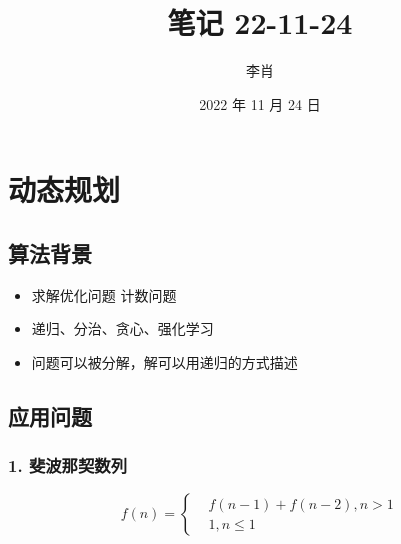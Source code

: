 \documentclass[UTF8]{ctexart}
\title{笔记 22-11-24}
\author{李肖}
\date{2022 年 11 月 24 日}
\begin{document}
\maketitle

\section*{动态规划}

\subsection*{算法背景}

\begin{itemize}
    \item 求解优化问题 计数问题
    \item 递归、分治、贪心、强化学习
    \item 问题可以被分解，解可以用递归的方式描述
\end{itemize}

\subsection*{应用问题}

\subsubsection*{1. 斐波那契数列}

\[
    f(n)=\left\{
    \begin{aligned}
         & f(n - 1) + f(n - 2), n > 1 \\
         & 1, n \le 1
    \end{aligned}
    \right.
\]
\end{document}
